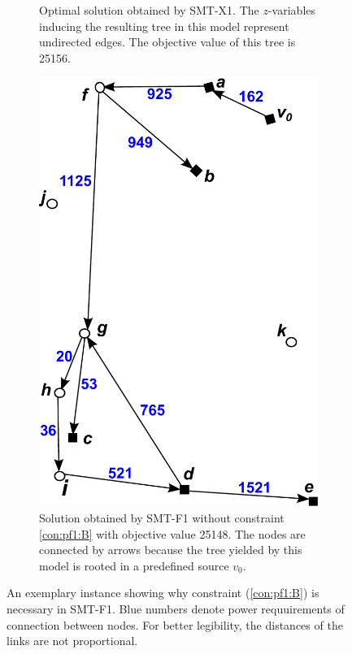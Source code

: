 \begin{figure}[!htb]
\begin{subfigure}[b]{0.4\textwidth}
        \caption{Optimal solution obtained by SMT-X1. The $z$-variables inducing the resulting tree in this model represent undirected edges. The objective value of this tree is 25156.}
        \label{fig:BorigSMT}
    \end{subfigure}
    \hfill %
    \begin{subfigure}[b]{0.4\textwidth}
        \includegraphics[width=\textwidth]{conBNec2}
        \caption{Solution obtained by SMT-F1 without constraint \ref{con:pf1:B} with objective value 25148. The nodes are connected by arrows because the tree yielded by this model is rooted in a predefined source $v_0$.}
        \label{fig:Bpf2}
    \end{subfigure}
    \caption{An exemplary instance showing why constraint (\ref{con:pf1:B}) is necessary in SMT-F1. Blue numbers denote power requuirements of connection between nodes. For better legibility, the distances of the links are not proportional.} \label{fig:BProof}
\end{figure}   
